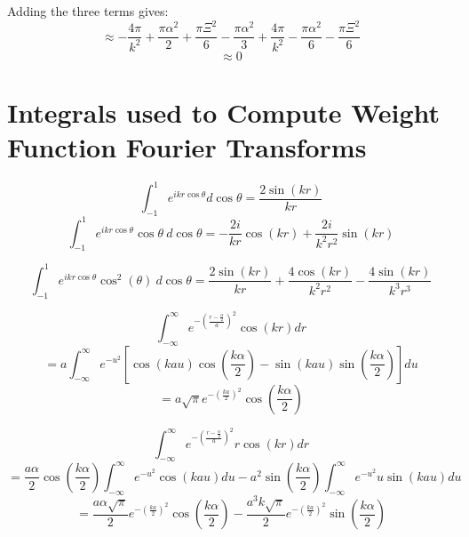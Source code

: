 \documentclass[double,12pt]{beavtex}
\begin{document}
Adding the three terms gives:
\begin{displaymath}{\approx-\frac{4\pi}{k^2}+\frac{\pi\alpha^2}{2}+\frac{\pi\Xi^2}{6}-\frac{\pi\alpha^2}{3}+\frac{4\pi}{k^2}-\frac{\pi\alpha^2}{6}-\frac{\pi\Xi^2}{6}}\end{displaymath} 
\begin{displaymath}{\approx0}\end{displaymath} 

\section{Integrals used to Compute Weight Function Fourier Transforms}
\begin{equation}{\int_{-1}^{1}{e^{ikr\cos{\theta}}d{\cos{\theta}}}=\frac{2\sin(kr)}{kr}}\end{equation} 
\begin{equation}{\int_{-1}^{1}{e^{ikr\cos{\theta}}\cos{\theta}{~}d{\cos{\theta}}}=-\frac{2i}{kr}\cos(kr)+\frac{2i}{k^2r^2}\sin(kr)}\end{equation} 

\begin{equation}{\int_{-1}^{1}{e^{ikr\cos{\theta}}\cos^2(\theta)~d{\cos{\theta}}}=\frac{2\sin(kr)}{kr}+\frac{4\cos(kr)}{k^2r^2}-\frac{4\sin(kr)}{k^3r^3}}\end{equation} 

\begin{equation}{\int_{-\infty}^{\infty}{e^{-\left(\frac{r-\frac{\alpha}{2}}{a}\right)^2}\cos(kr)d{r}}}\end{equation}
\begin{displaymath}{=a\int_{-\infty}^{\infty}{e^{-u^2}\left[\cos(kau)\cos(\frac{k\alpha}{2})-\sin(kau)\sin(\frac{k\alpha}{2})\right]d{u}}}\end{displaymath}  
\begin{equation}{=a\sqrt{\pi}e^{-\left(\frac{ka}{2}\right)^2}\cos(\frac{k\alpha}{2})}\end{equation} 

\begin{equation}{\int_{-\infty}^{\infty}{e^{-\left(\frac{r-\frac{\alpha}{2}}{a}\right)^2}r\cos(kr)d{r}}}\end{equation}
\begin{equation}{=\frac{a\alpha}{2}\cos\left(\frac{k\alpha}{2}\right)\int_{-\infty}^{\infty}{e^{-u^2}\cos(kau)d{u}} -a^2\sin\left(\frac{k\alpha}{2}\right)\int_{-\infty}^{\infty}{e^{-u^2}u\sin(kau)d{u}}}\end{equation}
\begin{equation}{=\frac{a\alpha\sqrt{\pi}}{2}e^{-\left(\frac{ka}{2}\right)^2}\cos\left(\frac{k\alpha}{2}\right)-\frac{a^3k\sqrt{\pi}}{2}e^{-\left(\frac{ka}{2}\right)^2}\sin\left(\frac{k\alpha}{2}\right)}\end{equation}
\end{document}

